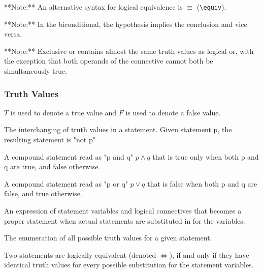 \documentclass[11pt]{article}
\begin{document}
**Note:** An alternative syntax for logical equivalence is $\equiv$ (\verb|\equiv|).

**Note:** In the biconditional, the hypothesis implies the conclusion and vice versa.

**Note:** Exclusive or contains almost the same truth values as logical or, with the exception
that both operands of the connective cannot both be simultaneously true.
\starOFF

\subsubsection{Truth Values}

$T$ is used to denote a true value and $F$ is used to denote a false value.

\begin{definition}[Negation]\label{def:negation}
    The interchanging of truth values in a statement.
    Given statement p, the resulting statement is "not p"
\end{definition}

\begin{definition}[Conjunction]\label{def:conjunction}
    A compound statement read as "p and q" $p \land q$ that 
    is true only when both p and q are true, and false otherwise.
\end{definition}

\begin{definition}[Disjunction]\label{def:disjunction}
    A compound statement read as "p or q" $p \lor q$
    that is false when both p and q are false, and true otherwise.
\end{definition}

\begin{definition}\label{def:statement-form}
    An expression of statement variables
    and logical connectives that becomes a proper statement
    when actual statements are substituted in for the variables.
\end{definition}

\begin{definition}\label{def:truth-table}
    The enumeration of all possible truth values for a given statement.
\end{definition}

\begin{definition}\label{def:logical-eq}
    Two statements are logically equivalent (denoted $\iff$),
    if and only if they have identical truth values
    for every possible substitution for the statement variables. 
\end{definition}
\end{document}

